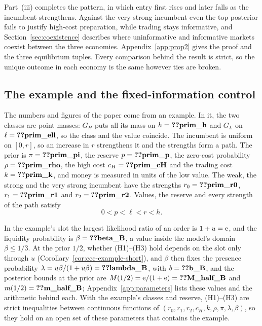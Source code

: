 Part~(iii) completes the pattern, in which entry first rises and later falls as the incumbent strengthens. Against
the very strong incumbent even the top posterior fails to justify high-cost preparation, while trading stays
informative, and Section~\ref{sec:coexistence} describes where uninformative and informative markets coexist between the
three economies. Appendix~\ref{app:prop2} gives the proof and the three equilibrium tuples. Every comparison behind
the result is strict, so the unique outcome in each economy is the same however ties are broken.

\subsection{The example and the fixed-information control}\label{sec:benchmark}

The numbers and figures of the paper come from an example. In it, the two classes are point masses: \(G_H\) puts
all its mass on \(h=\reg{prim_h}\) and \(G_L\) on \(\ell=\reg{prim_ell}\), so the class and the value coincide. The
incumbent is uniform on \([0,r]\), so an increase in \(r\) strengthens it and the strengths form a path. The prior is
\(\pi=\reg{prim_pi}\), the reserve \(p=\reg{prim_p}\), the zero-cost probability \(\rho=\reg{prim_rho}\), the high
cost \(c_H=\reg{prim_cH}\) and the trading cost \(k=\reg{prim_k}\), and money is measured in units of the low value.
The weak, the strong and the very strong incumbent have the strengths \(r_0=\reg{prim_r0}\), \(r_1=\reg{prim_r1}\)
and \(r_2=\reg{prim_r2}\). Values, the reserve and every strength of the path satisfy
\begin{equation}\label{eq:order}
0<p<\ell<r<h.
\end{equation}

In the example's slot the largest likelihood ratio of an order is \(1+u=\mathrm{e}\), and the liquidity probability is
\(\beta=\reg{beta_B}\), a value inside the model's domain \(\beta\le1/3\). At the prior \(1/2\), whether (H1)--(H3)
hold depends on the slot only through \(u\) (Corollary~\ref{cor:ccc-example-short}), and \(\beta\) then fixes the
presence probability \(\lambda=u\beta/(1+u\beta)=\reg{lambda_B}\), with
\(b=\reg{b_B}\), and the posterior bounds at the prior are \(M(1/2)=\eu/(1+\eu)=\reg{M_half_B}\) and
\(m(1/2)=\reg{m_half_B}\); Appendix~\ref{app:parameters} lists these values and the arithmetic behind each. With the
example's classes and reserve, (H1)--(H3) are strict inequalities between continuous functions of
\((r_0,r_1,r_2,c_H,k,\rho,\pi,\lambda,\beta)\), so they hold on an open set of these parameters that contains the
example.

